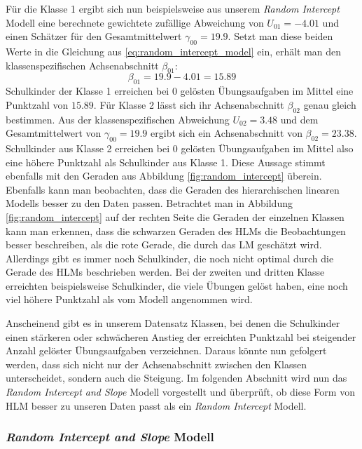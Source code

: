 \documentclass[12pt, a4paper]{article}\usepackage[]{graphicx}\usepackage[]{color}
\begin{document}
Für die Klasse 1 ergibt sich nun beispielsweise aus unserem \textit{Random Intercept} Modell eine berechnete gewichtete zufällige Abweichung von $U_{01} = -4.01$ und einen Schätzer für den Gesamtmittelwert $\gamma_{00} = 19.9$. Setzt man diese beiden Werte in die Gleichung aus \eqref{eq:random_intercept_model} ein, erhält man den klassenspezifischen Achsenabschnitt $\beta_{01}$:
\begin{equation}
\beta_{01} = 19.9 - 4.01 = 15.89
\end{equation} 
Schulkinder der Klasse 1 erreichen bei $0$ gelösten Übungsaufgaben im Mittel eine Punktzahl von $15.89$. Für Klasse 2 lässt sich ihr Achsenabschnitt $\beta_{02}$ genau gleich bestimmen. Aus der klassenspezifischen Abweichung $U_{02} = 3.48$ und dem Gesamtmittelwert von $\gamma_{00} = 19.9$ ergibt sich ein Achsenabschnitt von $\beta_{02} = 23.38$. Schulkinder aus Klasse 2 erreichen bei 0 gelösten Übungsaufgaben im Mittel also eine höhere Punktzahl als Schulkinder aus Klasse 1. Diese Aussage stimmt ebenfalls mit den Geraden aus Abbildung \ref{fig:random_intercept} überein. Ebenfalls kann man beobachten, dass die Geraden des hierarchischen linearen Modells besser zu den Daten passen. Betrachtet man in Abbildung \ref{fig:random_intercept} auf der rechten Seite die Geraden der einzelnen Klassen kann man erkennen, dass die schwarzen Geraden des HLMs die Beobachtungen besser beschreiben, als die rote Gerade, die durch das LM geschätzt wird. Allerdings gibt es immer noch Schulkinder, die noch nicht optimal durch die Gerade des HLMs beschrieben werden. Bei der zweiten und dritten Klasse erreichten beispielsweise Schulkinder, die viele Übungen gelöst haben, eine noch viel höhere Punktzahl als vom Modell angenommen wird. 

Anscheinend gibt es in unserem Datensatz Klassen, bei denen die Schulkinder einen stärkeren oder schwächeren Anstieg der erreichten Punktzahl bei steigender Anzahl gelöster Übungsaufgaben verzeichnen. Daraus könnte nun gefolgert werden, dass sich nicht nur der Achsenabschnitt zwischen den Klassen unterscheidet, sondern auch die Steigung. Im folgenden Abschnitt wird nun das \textit{Random Intercept and Slope} Modell vorgestellt und überprüft, ob diese Form von HLM besser zu unseren Daten passt als ein \textit{Random Intercept} Modell.

\subsubsection{\textit{Random Intercept and Slope} Modell} \label{section:random_intercept_slope_model}
\end{document}
